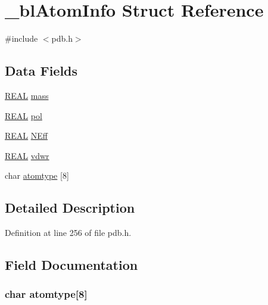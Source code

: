 \hypertarget{struct__bl_atom_info}{\section{\-\_\-bl\-Atom\-Info Struct Reference}
\label{struct__bl_atom_info}
}


{\ttfamily \#include $<$pdb.\-h$>$}

\subsection*{Data Fields}
\begin{DoxyCompactItemize}
\item 
\hyperlink{_math_type_8h_a5821460e95a0800cf9f24c38915cbbde}{R\-E\-A\-L} \hyperlink{struct__bl_atom_info_a7709794c305d62392e3311b11def51d2}{mass}
\item 
\hyperlink{_math_type_8h_a5821460e95a0800cf9f24c38915cbbde}{R\-E\-A\-L} \hyperlink{struct__bl_atom_info_ae7fb48fccd858aaea009b0f834f04d00}{pol}
\item 
\hyperlink{_math_type_8h_a5821460e95a0800cf9f24c38915cbbde}{R\-E\-A\-L} \hyperlink{struct__bl_atom_info_ad12549b89f9994f60f6fff31d1b47e3c}{N\-Eff}
\item 
\hyperlink{_math_type_8h_a5821460e95a0800cf9f24c38915cbbde}{R\-E\-A\-L} \hyperlink{struct__bl_atom_info_a895ae3f24189fb46b3a5a753260d34f8}{vdwr}
\item 
char \hyperlink{struct__bl_atom_info_ae34fc326f038c4326bb29526b624a304}{atomtype} \mbox{[}8\mbox{]}
\end{DoxyCompactItemize}


\subsection{Detailed Description}


Definition at line 256 of file pdb.\-h.



\subsection{Field Documentation}
\hypertarget{struct__bl_atom_info_ae34fc326f038c4326bb29526b624a304}{
\subsubsection[{atomtype}]{\setlength{\rightskip}{0pt plus 5cm}char atomtype\mbox{[}8\mbox{]}}}\label{struct__bl_atom_info_ae34fc326f038c4326bb29526b624a304}


